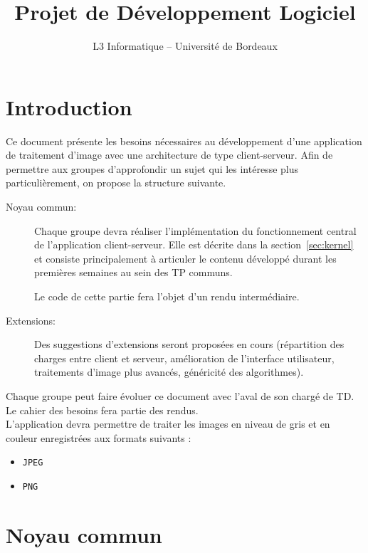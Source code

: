 \documentclass[a4paper,12pt]{article}
\title{\sffamily \textbf{Projet de Développement Logiciel}}
\author{L3 Informatique -- Université de Bordeaux}
\date{}
\newcounter{besoin}
\begin{document}
\maketitle


\section{Introduction}

Ce document présente les besoins nécessaires au développement d'une application
de traitement d'image avec une architecture de type client-serveur.
Afin de permettre aux groupes d'approfondir un sujet qui les intéresse plus
particulièrement, on propose la structure suivante.

\begin{description}
\item[Noyau commun:] Chaque groupe devra réaliser l'implémentation du fonctionnement central de l'application client-serveur. Elle est décrite dans la section~\ref{sec:kernel} et consiste principalement à articuler le contenu développé durant les premières semaines au sein des TP communs.

 Le code de cette partie fera l'objet d'un rendu intermédiaire.
  
\item [Extensions: ] Des suggestions d'extensions seront proposées en cours (répartition des charges entre client et serveur, amélioration de l'interface utilisateur, traitements d'image plus avancés,  généricité des algorithmes).
  
\end{description}


Chaque groupe peut faire évoluer ce document avec l'aval de son chargé de TD. Le cahier des besoins fera partie des rendus.\\


L'application devra permettre de traiter les images en niveau de gris et en
couleur enregistrées aux formats suivants :

\begin{itemize}
\item \verb!JPEG!
\item \verb!PNG!
\end{itemize}



\section{\label{sec:kernel}Noyau commun}
\end{document}
